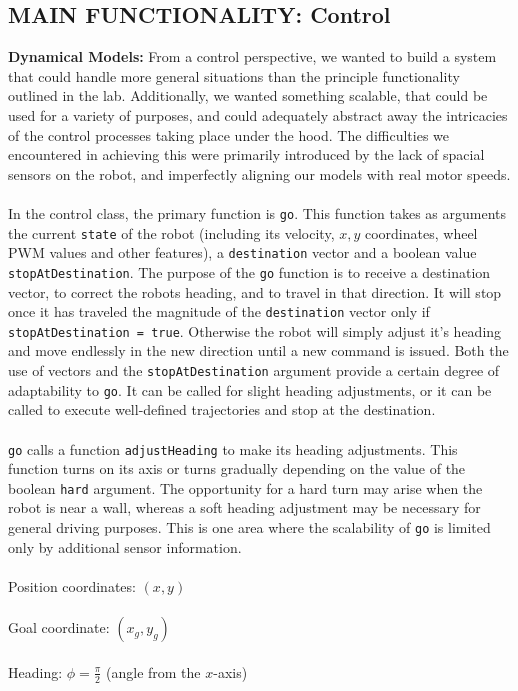 \documentclass[paper=a4, fontsize=11pt]{scrartcl}
\numberwithin{equation}{section}		%
\numberwithin{figure}{section}			%
\numberwithin{table}{section}				%
\begin{document}
{\subsection{MAIN FUNCTIONALITY: Control}
\textbf{Dynamical Models: }
From a control perspective, we wanted to build a system that could handle more general situations than the principle functionality outlined in the lab. Additionally, we wanted something scalable, that could be used for a variety of purposes, and could adequately abstract away the intricacies of the control processes taking place under the hood. The difficulties we encountered in achieving this were primarily introduced by the lack of spacial sensors on the robot, and imperfectly aligning our models with real motor speeds. \\\\
In the control class, the primary function is \texttt{go}. This function takes as arguments the current \texttt{state} of the robot (including its velocity, $x, y$ coordinates, wheel PWM values and  other features), a \texttt{destination} vector and a boolean value \texttt{stopAtDestination}. The purpose of the \texttt{go} function is to receive a destination vector, to correct the robots heading, and to travel in that direction. It will stop once it has traveled the magnitude of the \texttt{destination} vector only if \texttt{stopAtDestination = true}. Otherwise the robot will simply adjust it's heading and move endlessly in the new direction until a new command is issued. Both the use of vectors and the \texttt{stopAtDestination} argument provide a certain degree of adaptability to \texttt{go}. It can be called for slight heading adjustments, or it can be called to execute well-defined trajectories and stop at the destination. \\\\
\texttt{go} calls a function \texttt{adjustHeading} to make its heading adjustments. This function turns on its axis or turns gradually depending on the value of the boolean \texttt{hard} argument. The opportunity for a hard turn may arise when the robot is near a wall, whereas a soft heading adjustment may be necessary for general driving purposes. This is one area where the scalability of \texttt{go} is limited only by additional sensor information.
\\\\
Position coordinates: $(x,y)$
\\\\
Goal coordinate: $(x_g,y_g)$
\\\\
Heading: $\phi = \frac{\pi}{2}$ (angle from the $x$-axis)
\\\\

}
\end{document}
